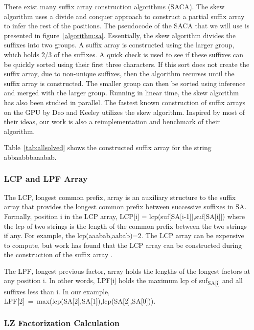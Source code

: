 There exist many suffix array construction algorithms (SACA).
The skew algorithm \cite{karkkainen2003simple} uses a divide and conquer approach to construct a partial suffix array to infer the rest of the positions.
The pseudocode of the SACA that we will use is presented in figure~\ref{algorithm:sa}.
Essentially, the skew algorithm divides the suffixes into two groups.
A suffix array is constructed using the larger group, which holds 2/3 of the suffixes.
A quick check is used to see if these suffixes can be quickly sorted using their first three characters.
If this sort does not create the suffix array, due to non-unique suffixes, then the algorithm recurses until the suffix array is constructed.
The smaller group can then be sorted using inference and merged with the larger group.
Running in linear time, the skew algorithm has also been studied in parallel.
The fastest known construction of suffix arrays on the GPU by Deo and Keeley\cite{Deo} utilizes the skew algorithm.
Inspired by most of their ideas, our work is also a reimplementation and benchmark of their algorithm.

Table~\ref{tab:allsolved} shows the constructed suffix array for the string abbaabbbaaabab.

\subsubsection{LCP and LPF Array}

The LCP, longest common prefix, array is an auxiliary structure to the suffix array that provides the longest common prefix between successive suffixes in SA.
Formally, position i in the LCP array, LCP[i] = lcp(suf[SA[i-1]],suf[SA[i]]) where the lcp of two strings is the length of the common prefix between the two strings if any.
For example, the lcp(aaabab,aabab)=2.
The LCP array can be expensive to compute, but work has found that the LCP array can be constructed during the construction of the suffix array \cite{lcp}.

The LPF, longest previous factor, array holds the lengths of the longest factors at any position i.
In other words, LPF[i] holds the maximum lcp of suf\textsubscript{SA[i]} and all suffixes less than i.
In our example, LPF[2]~=~max(lcp(SA[2],SA[1]),lcp(SA[2],SA[0])).

\subsubsection{LZ Factorization Calculation}

